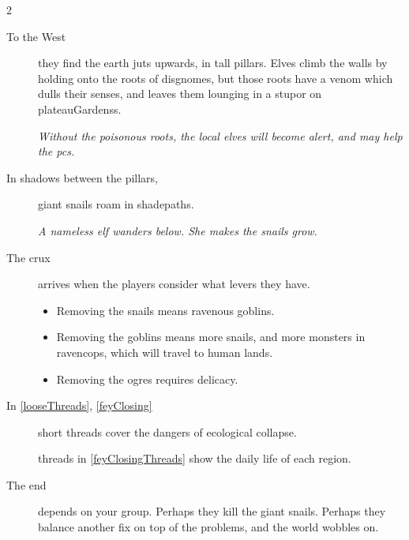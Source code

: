 \begin{multicols}{2}
\begin{description}
  \item[To the West]
  they find the earth juts upwards, in tall pillars.
  Elves climb the walls by holding onto the roots of \glspl{disgnome}, but those roots have a venom which dulls their senses, and leaves them lounging in a stupor on \glspl{plateauGardens}.

  \textit{Without the poisonous roots, the local elves will become alert, and may help the \glspl{pc}.}
  \item[In shadows between the pillars,]
  giant snails roam in \gls{shadepaths}.

  \textit{A nameless elf wanders below.
  She makes the snails grow.}

  \item[The crux]
  arrives when the players consider what levers they have.
  \begin{itemize}
    \item
    Removing the snails means ravenous goblins.
    \item
    Removing the goblins means more snails, and more monsters in \gls{ravencops}, which will travel to human lands.
    \item
    Removing the \glspl{ogre} requires delicacy.
  \end{itemize}
  \item[In \autoref{looseThreads}, \autoref{feyClosing}]
  short \glspl{thread} cover the dangers of ecological collapse.

  \Glspl{thread} in \autoref{feyClosingThreads} show the daily life of each \gls{region}.

  \item[The end]
  depends on your group.
  Perhaps they kill the giant snails.
  Perhaps they balance another fix on top of the problems, and the world wobbles on.
\end{description}


\end{multicols}
